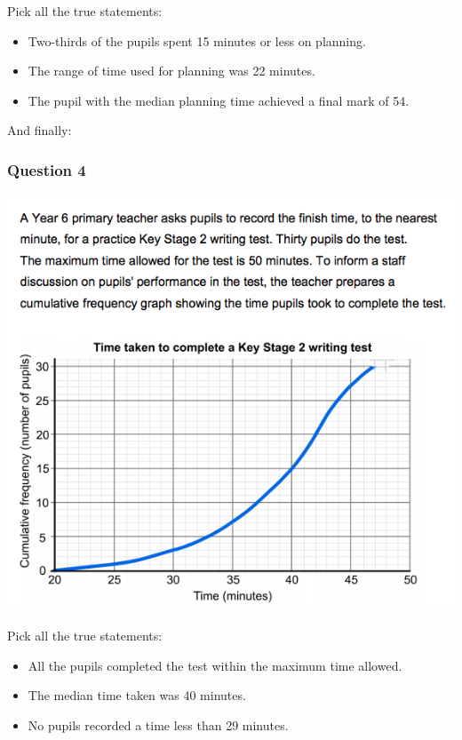 \documentclass[
]{book}
\providecommand{\tightlist}{%
  \setlength{\itemsep}{0pt}\setlength{\parskip}{0pt}}
\begin{document}
Pick all the true statements:

\begin{itemize}
\tightlist
\item
  Two-thirds of the pupils spent 15 minutes or less on planning.
\item
  The range of time used for planning was 22 minutes.
\item
  The pupil with the median planning time achieved a final mark of 54.
\end{itemize}

And finally:

\hypertarget{question-4}{%
\subsubsection*{Question 4}\label{question-4}}

\includegraphics{imgs/numtest_4.png}

Pick all the true statements:

\begin{itemize}
\tightlist
\item
  All the pupils completed the test within the maximum time allowed.
\item
  The median time taken was 40 minutes.
\item
  No pupils recorded a time less than 29 minutes.
\end{itemize}
\end{document}
